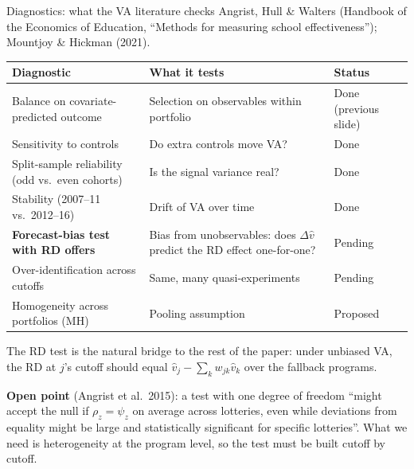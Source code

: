 \documentclass{beamer}
\begin{document}
\begin{frame}{Diagnostics: what the VA literature checks}
\scriptsize
Angrist, Hull \& Walters (Handbook of the Economics of Education, ``Methods for measuring school effectiveness''); Mountjoy \& Hickman (2021).

\vspace{0.15cm}
\begin{tabular}{p{4.2cm}p{4.1cm}l}
\toprule
Diagnostic & What it tests & Status \\
\midrule
Balance on covariate-predicted outcome & Selection on observables within portfolio & Done (previous slide) \\
Sensitivity to controls & Do extra controls move VA? & Done \\
Split-sample reliability (odd vs.\ even cohorts) & Is the signal variance real? & Done \\
Stability (2007--11 vs.\ 2012--16) & Drift of VA over time & Done \\
\textbf{Forecast-bias test with RD offers} & Bias from unobservables: does $\Delta\hat v$ predict the RD effect one-for-one? & Pending \\
Over-identification across cutoffs & Same, many quasi-experiments & Pending \\
Homogeneity across portfolios (MH) & Pooling assumption & Proposed \\
\bottomrule
\end{tabular}

\vspace{0.2cm}
The RD test is the natural bridge to the rest of the paper: under unbiased VA, the RD at $j$'s cutoff should equal $\hat v_j-\sum_k w_{jk}\hat v_k$ over the fallback programs.

\vspace{0.1cm}
\textbf{Open point} (Angrist et al.\ 2015): a test with one degree of freedom ``might accept the null if $\rho_z=\psi_z$ on average across lotteries, even while deviations from equality might be large and statistically significant for specific lotteries''. What we need is heterogeneity at the program level, so the test must be built cutoff by cutoff.
\end{frame}
\end{document}
